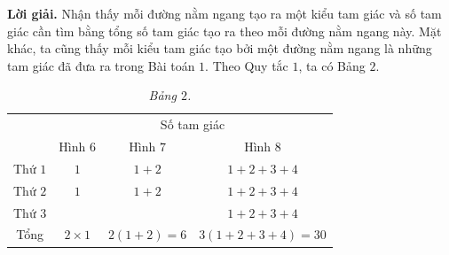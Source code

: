 	\begin{figure}[H]
		\centering
		\vspace*{5pt}
		\captionsetup{labelformat= empty, justification=centering}
		\captionsetup[subfigure]{labelformat=empty}
		\hfill{}
		\hfill
		\hfill
		\hfill
		\vspace*{-10pt}
	\end{figure}    
	\textbf{\color{toancuabi}Lời giải.} Nhận thấy mỗi đường nằm ngang tạo ra một kiểu tam giác và số tam giác cần tìm bằng tổng số tam giác tạo ra theo mỗi đường nằm ngang này. Mặt khác, ta cũng thấy mỗi kiểu tam giác tạo bởi một đường nằm ngang là những tam giác đã đưa ra trong Bài toán $1$.
	\vskip 0.1cm
	Theo Quy tắc $1$, ta có Bảng $2$.
\begin{table}[H]
	\vspace*{-5pt}
\centering
\begin{tabular}{|c|c|c|c|}
	\hline
	\multirow{2}{5em}{\centering{Đường nằm ngang}}&\multicolumn{3}{c|}{Số tam giác}\\
	\cline{2-4}
	&Hình $6$&Hình $7$&Hình $8$\\
	\hline
	Thứ $1$ & $1$ &$1+2$& $1+2+3+4$\\
	\hline
	Thứ $2$ &$1$&$1+2$&$1+2+3+4$\\
	\hline
	Thứ $3$ &  & & $1+2+3+4$\\
	\hline
	Tổng &$2\times 1$ &$2(1+2)=6$&$3(1+2+3+4) = 30$\\
	\hline
\end{tabular}
\captionsetup{labelformat= empty, justification=centering}
\caption{\textit{\color{toancuabi}Bảng $2$.}}
\vspace*{-5pt}
\end{table}
